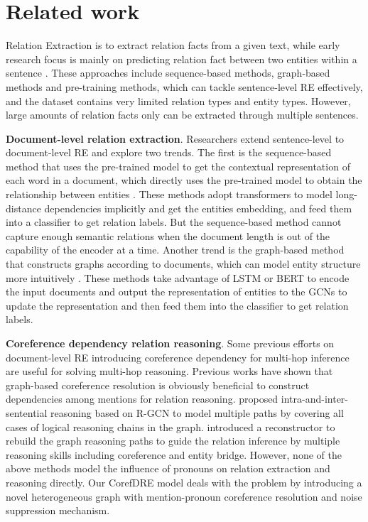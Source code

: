 \documentclass{article}
\begin{document}
\section{Related work}

Relation Extraction is to extract relation facts from a given text, while early research focus is mainly on predicting relation fact between two entities within a sentence \cite{zeng2015distant,wang2016relation,zhang2017position,zhao2021modeling,liu2021attention,guo2021learning,shang2022pattern}. These approaches include sequence-based methods, graph-based methods and pre-training methods, which can tackle sentence-level RE effectively, and the dataset contains very limited relation types and entity types. However, large amounts of relation facts only can be extracted through multiple sentences. 

\textbf{Document-level relation extraction}.  Researchers extend sentence-level to document-level RE \cite{christopoulou2019connecting,wang2020global,zhang2021document} and explore two trends. The first is the sequence-based method that uses the pre-trained model to get the contextual representation of each word in a document, which directly uses the pre-trained model to obtain the relationship between entities \cite{ye2020coreferential}. These methods adopt transformers to model long-distance dependencies implicitly and get the entities embedding, and feed them into a classifier to get relation labels. But the sequence-based method cannot capture enough semantic relations when the document length is out of the capability of the encoder at a time. Another trend is the graph-based method that constructs graphs according to documents, which can model entity structure more intuitively  \cite{sahu2019inter,zhu2019graph,zeng2020double}. These methods take advantage of LSTM or BERT to encode the input documents and output the representation of entities to the GCNs to update the representation and then feed them into the classifier to get relation labels.

\textbf{Coreference dependency relation reasoning}. Some previous efforts on document-level RE introducing coreference dependency for multi-hop inference are useful for solving multi-hop reasoning. Previous works \cite{zhu2019graph,sahu2019inter,fu2021end} have shown that graph-based coreference resolution is obviously beneficial to construct dependencies among mentions for relation reasoning. \cite{zeng2021sire} proposed intra-and-inter-sentential reasoning based on R-GCN to model multiple paths by covering all cases of logical reasoning chains in the graph. \cite{xu2021discriminative} introduced a reconstructor to rebuild the graph reasoning paths to guide the relation inference by multiple reasoning skills including coreference and entity bridge. However, none of the above methods model the influence of pronouns on relation extraction and reasoning directly. Our CorefDRE model deals with the problem by introducing a novel heterogeneous graph with mention-pronoun coreference resolution and noise suppression mechanism.  
\end{document}
